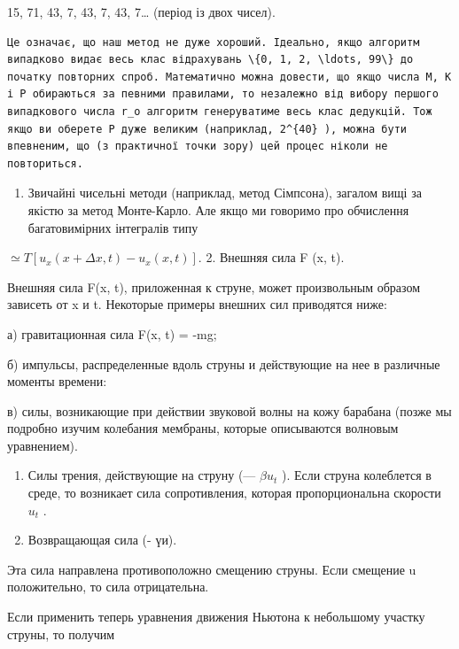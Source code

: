 \documentclass[
  ukrainian,
]{article}
\providecommand{\tightlist}{%
  \setlength{\itemsep}{0pt}\setlength{\parskip}{0pt}}
\begin{document}
15, 71, 43, 7, 43, 7, 43, 7\ldots{} (період із двох чисел).

\begin{verbatim}
Це означає, що наш метод не дуже хороший. Ідеально, якщо алгоритм випадково видає весь клас відрахувань \{0, 1, 2, \ldots, 99\} до початку повторних спроб. Математично можна довести, що якщо числа M, K і P обираються за певними правилами, то незалежно від вибору першого випадкового числа r_o алгоритм генеруватиме весь клас дедукцій. Тож якщо ви оберете P дуже великим (наприклад, 2^{40} ), можна бути впевненим, що (з практичної точки зору) цей процес ніколи не повториться.
\end{verbatim}

\begin{enumerate}
\def\labelenumi{\arabic{enumi}.}
\setcounter{enumi}{1}
\tightlist
\item
  Звичайні чисельні методи (наприклад, метод Сімпсона), загалом вищі за
  якістю за метод Монте-Карло. Але якщо ми говоримо про обчислення
  багатовимірних інтегралів типу
\end{enumerate}

\(\simeq T [u_x(x + \Delta x, t) - u_x(x, t)].\) 2. Внешняя сила F (x,
t).

Внешняя сила F(x, t), приложенная к струне, может произвольным образом
зависеть от x и t. Некоторые примеры внешних сил приводятся ниже:

а) гравитационная сила F(x, t) = -mg;

б) импульсы, распределенные вдоль струны и действующие на нее в
различные моменты времени:

в) силы, возникающие при действии звуковой волны на кожу барабана (позже
мы подробно изучим колебания мембраны, которые описываются волновым
уравнением).

\begin{enumerate}
\def\labelenumi{\arabic{enumi}.}
\setcounter{enumi}{2}
\item
  Силы трения, действующие на струну (--- \(\beta u_t\) ). Если струна
  колеблется в среде, то возникает сила сопротивления, которая
  пропорциональна скорости \(u_t\) .
\item
  Возвращающая сила (- үи).
\end{enumerate}

Эта сила направлена противоположно смещению струны. Если смещение u
положительно, то сила отрицательна.

Если применить теперь уравнения движения Ньютона к небольшому участку
струны, то получим
\end{document}
